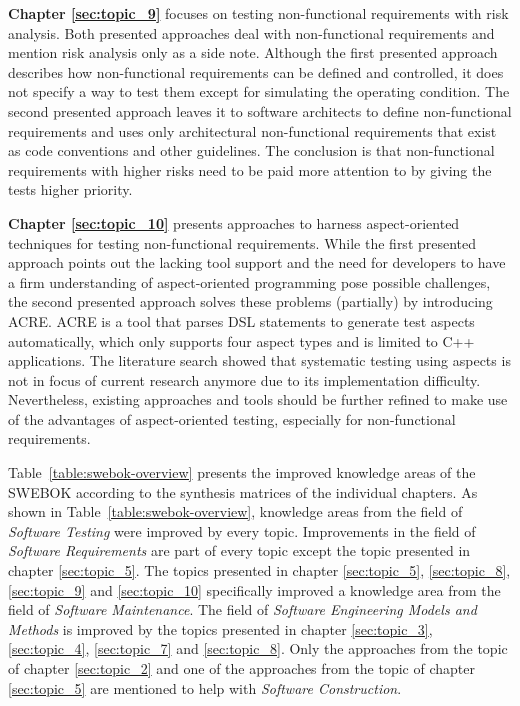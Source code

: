 \textbf{Chapter \ref{sec:topic_9}} focuses on testing non-functional requirements with risk analysis. Both presented approaches deal with non-functional requirements and mention risk analysis only as a side note. Although the first presented approach \cite{ZouPavlovski2008} describes how non-functional requirements can be defined and controlled, it does not specify a way to test them except for simulating the operating condition. The second presented approach \cite{Lagerstedt2014} leaves it to software architects to define non-functional requirements and uses only architectural non-functional requirements that exist as code conventions and other guidelines. The conclusion is that non-functional requirements with higher risks need to be paid more attention to by giving the tests higher priority.

\textbf{Chapter \ref{sec:topic_10}} presents approaches to harness aspect-oriented techniques for testing non-functional requirements. While the first presented approach \cite{Metsa} points out the lacking tool support and the need for developers to have a firm understanding of aspect-oriented programming pose possible challenges, the second presented approach \cite{Duclos} solves these problems (partially) by introducing ACRE. ACRE is a tool that parses DSL statements to generate test aspects automatically, which only supports four aspect types and is limited to C++ applications. The literature search showed that systematic testing using aspects is not in focus of current research anymore due to its implementation difficulty. Nevertheless, existing approaches and tools should be further refined to make use of the advantages of aspect-oriented testing, especially for non-functional requirements. 

Table~\ref{table:swebok-overview} presents the improved knowledge areas of the SWEBOK according to the synthesis matrices of the individual chapters. As shown in Table~\ref{table:swebok-overview}, knowledge areas from the field of \textit{Software Testing} were improved by every topic. Improvements in the field of \textit{Software Requirements} are part of every topic except the topic presented in chapter \ref{sec:topic_5}. The topics presented in chapter \ref{sec:topic_5}, \ref{sec:topic_8}, \ref{sec:topic_9} and \ref{sec:topic_10} specifically improved a knowledge area from the field of \textit{Software Maintenance}. The field of \textit{Software Engineering Models and Methods} is improved by the topics presented in chapter \ref{sec:topic_3}, \ref{sec:topic_4}, \ref{sec:topic_7} and \ref{sec:topic_8}. Only the approaches from the topic of chapter \ref{sec:topic_2} and one of the approaches from the topic of chapter \ref{sec:topic_5} are mentioned to help with \textit{Software Construction}.

